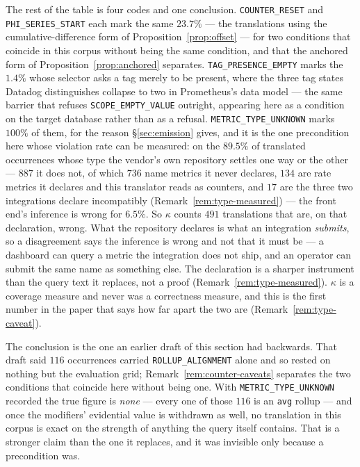 \iffull\fi
\iffull\fi

The rest of the table is four codes and one conclusion.
\texttt{COUNTER\_RESET} and \texttt{PHI\_SERIES\_START} each mark the same $23.7\%$ ---
the translations using the cumulative-difference form of
Proposition~\ref{prop:offset} --- for two conditions that coincide in this corpus
without being the same condition, and that the anchored form of
Proposition~\ref{prop:anchored} separates. \texttt{TAG\_PRESENCE\_EMPTY} marks the
$1.4\%$ whose selector asks a tag merely to be present, where the three tag states
Datadog distinguishes collapse to two in Prometheus's data model --- the same barrier
that refuses \texttt{SCOPE\_EMPTY\_VALUE} outright, appearing here as a condition on the
target database rather than as a refusal. \texttt{METRIC\_TYPE\_UNKNOWN} marks
$100\%$ of them, for the reason \S\ref{sec:emission} gives, and it is the one
precondition here whose violation rate can be measured: on the $89.5\%$ of translated
occurrences whose type the vendor's own repository settles one way or the other ---
$887$ it does not, of which $736$ name metrics it never declares, $134$ are rate
metrics it declares and this translator reads as counters, and $17$ are the three
two integrations declare incompatibly (Remark~\ref{rem:type-measured}) --- the
front end's inference
is wrong for $6.5\%$. So $\kappa$ counts $491$ translations that are, on that
declaration, wrong. What the repository declares is what an integration \emph{submits}, so
a disagreement says the inference is wrong and not that it must be --- a dashboard can
query a metric the integration does not ship, and an operator can submit the same name as
something else. The declaration is a sharper instrument than the query text it replaces,
not a proof (Remark~\ref{rem:type-measured}). $\kappa$ is a coverage measure and never was
a correctness measure, and this is the first number in the paper that says how far apart
the two are (Remark~\ref{rem:type-caveat}).

The conclusion is the one an earlier draft of this section had backwards. That draft said
$116$ occurrences carried \texttt{ROLLUP\_ALIGNMENT} alone and so rested on nothing but
the evaluation grid; Remark~\ref{rem:counter-caveats} separates the two conditions that
coincide here without being one. With \texttt{METRIC\_TYPE\_UNKNOWN} recorded the true figure is
\emph{none} --- every one of those $116$ is an \texttt{avg} rollup --- and once the
modifiers' evidential value is withdrawn as well, no translation in this corpus is exact
on the strength of anything the query itself contains. That is a stronger claim than the
one it replaces, and it was invisible only because a precondition was.

